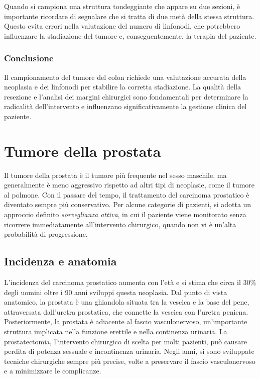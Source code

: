 Quando si campiona una struttura tondeggiante che appare su due sezioni, è importante ricordare di segnalare che si tratta di due metà della stessa struttura. Questo evita errori nella valutazione del numero di linfonodi, che potrebbero influenzare la stadiazione del tumore e, conseguentemente, la terapia del paziente.

\subsubsection{Conclusione}
Il campionamento del tumore del colon richiede una valutazione accurata della neoplasia e dei linfonodi per stabilire la corretta stadiazione. La qualità della resezione e l'analisi dei margini chirurgici sono fondamentali per determinare la radicalità dell'intervento e influenzano significativamente la gestione clinica del paziente.

\section{Tumore della prostata}
Il tumore della prostata è il tumore più frequente nel sesso maschile, ma generalmente è meno aggressivo rispetto ad altri tipi di neoplasie, come il tumore al polmone. Con il passare del tempo, il trattamento del carcinoma prostatico è diventato sempre più conservativo. Per alcune categorie di pazienti, si adotta un approccio definito \textit{sorveglianza attiva}, in cui il paziente viene monitorato senza ricorrere immediatamente all'intervento chirurgico, quando non vi è un'alta probabilità di progressione.

\subsection{Incidenza e anatomia}
L'incidenza del carcinoma prostatico aumenta con l'età e si stima che circa il 30\% degli uomini oltre i 90 anni sviluppi questa neoplasia. Dal punto di vista anatomico, la prostata è una ghiandola situata tra la vescica e la base del pene, attraversata dall'uretra prostatica, che connette la vescica con l'uretra peniena. Posteriormente, la prostata è adiacente al fascio vasculonervoso, un'importante struttura implicata nella funzione erettile e nella continenza urinaria. La prostatectomia, l'intervento chirurgico di scelta per molti pazienti, può causare perdita di potenza sessuale e incontinenza urinaria. Negli anni, si sono sviluppate tecniche chirurgiche sempre più precise, volte a preservare il fascio vasculonervoso e a minimizzare le complicanze.

